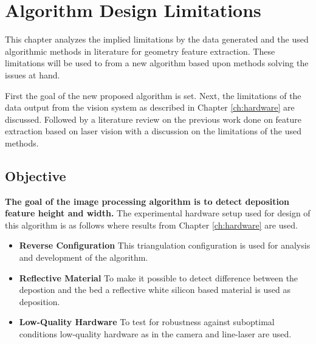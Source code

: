 
\chapter{Algorithm Design Limitations}\label{ch:design} 
This chapter analyzes the implied limitations by the data generated and the used algorithmic methods in literature for geometry feature extraction.  These limitations will be used to from a new algorithm based upon methods solving the issues at hand. 

First the goal of the new proposed algorithm is set. Next, the limitations of the data output from the vision system as described in Chapter \ref{ch:hardware} are discussed. Followed by a literature review on the previous work done on feature extraction based on laser vision with a discussion on the limitations of the used methods. 

\section{Objective}
\textbf{The goal of the image processing algorithm is to detect deposition feature height and width.} The experimental hardware setup used for design of this algorithm is as follows where results from Chapter \ref{ch:hardware} are used. 

\begin{itemize}
\item \textbf{Reverse Configuration} This triangulation configuration is used for analysis and development of the algorithm. 
\item \textbf{Reflective Material} To make it possible to detect difference between the depostion and the bed a reflective white silicon based material is used as deposition.
\item \textbf{Low-Quality Hardware} To test for robustness against suboptimal conditions low-quality hardware as in the camera and line-laser are used.
\end{itemize}

